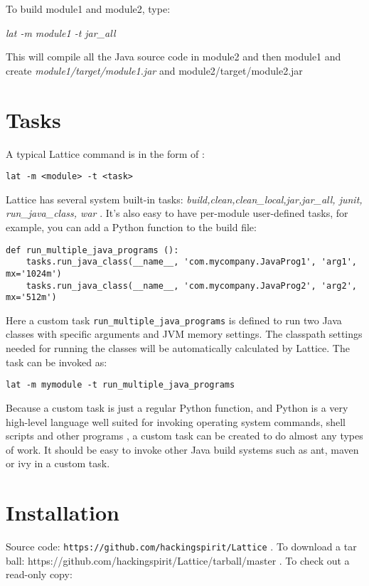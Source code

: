 \documentclass[12pt]{article}
\begin{document}
To build module1 and module2, type:

{\it   lat -m module1 -t jar\_all} 

This will compile all the Java source code in module2 and then module1
and create \emph{module1/target/module1.jar} and module2/target/module2.jar


\section{Tasks}

A typical Lattice command is in the form of :

\begin{verbatim}
lat -m <module> -t <task>
\end{verbatim}

Lattice has several system built-in tasks: {\it
  build,clean,clean\_local,jar,jar\_all, junit, run\_java\_class,
  war
}.
It's also easy to have per-module user-defined tasks, for example, you
can add a Python function to the build file:

\begin{verbatim}
def run_multiple_java_programs ():
    tasks.run_java_class(__name__, 'com.mycompany.JavaProg1', 'arg1',
mx='1024m')
    tasks.run_java_class(__name__, 'com.mycompany.JavaProg2', 'arg2',
mx='512m')
\end{verbatim}

Here a custom task {\tt run\_multiple\_java\_programs}  is defined to run two Java classes with specific
arguments and JVM memory settings. The classpath settings needed for
running the classes will be automatically calculated by Lattice. The
task can be invoked as:
\begin{verbatim}
lat -m mymodule -t run_multiple_java_programs
\end{verbatim}
Because a custom task is just a regular Python function, and Python is
a very high-level language well suited for invoking operating system
commands, shell scripts and other programs , a
custom task can be created to do almost any types of work. It should
be easy to invoke other Java build systems such as ant, maven or ivy in
a custom task.

\section{Installation}

Source code:  {\tt https://github.com/hackingspirit/Lattice}  .
To download a tar ball:
https://github.com/hackingspirit/Lattice/tarball/master  .
To check out a read-only copy: 
\end{document}
